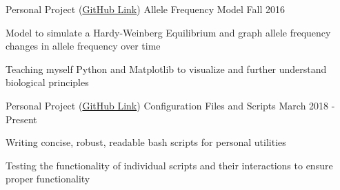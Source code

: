   \cventry
    {Personal Project (\href{https://github.com/DJSiddharthVader/alleleFrequency}{GitHub Link})}
    {Allele Frequency Model} %
    {} %
    {Fall 2016} %
    {
      \begin{cvitems}
        \item{Model to simulate a Hardy-Weinberg Equilibrium and graph allele frequency changes in allele frequency over time}
        \item{Teaching myself Python and Matplotlib to visualize and further understand biological principles}
      \end{cvitems}
    }
	\cventry
      {Personal Project (\href{https://github.com/DJSiddharthVader/dotfiles}{GitHub Link})}
      {Configuration Files and Scripts}
      {}
      {March 2018 - Present}
      {
        \begin{cvitems}
          \item{Writing  concise, robust, readable bash scripts for personal utilities}
          \item{Testing the functionality of individual scripts and their interactions to ensure proper functionality}
        \end{cvitems}
      }
